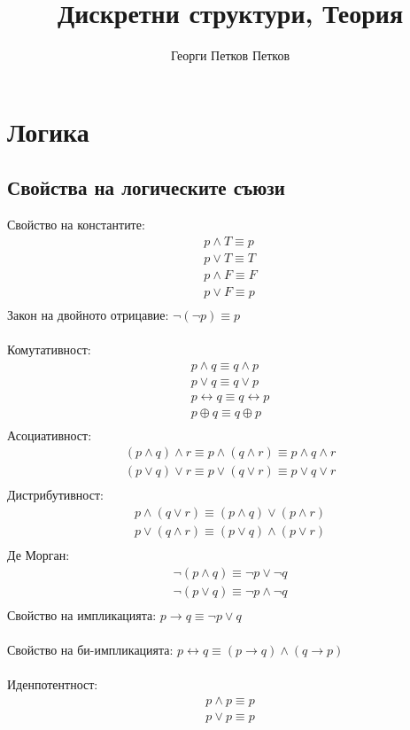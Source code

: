 \documentclass[12pt]{article}
\title{Дискретни структури, Теория}
\author{Георги Петков Петков}
\date{}
\begin{document}
    \maketitle
    \section{Логика}
    \subsection*{Свойства на логическите съюзи}
    Свойство на константите:
    \begin{gather*}
        p \land T \equiv p \\
        p \lor T \equiv T \\
        p \land F \equiv F \\
        p \lor F \equiv p \\
    \end{gather*}
    Закон на двойното отрицавие: \( \neg(\neg p) \equiv p \) \\ \\
    Комутативност: 
    \begin{gather*}
        p \land q \equiv q \land p \\
        p \lor q \equiv q \lor p \\
        p \leftrightarrow q \equiv q \leftrightarrow p \\
        p \oplus q \equiv q \oplus p \\
    \end{gather*}
    Асоциативност:
    \begin{gather*}
        (p \land q) \land r \equiv p \land (q \land r) \equiv p \land q \land r \\
        (p \lor q) \lor r \equiv p \lor (q \lor r) \equiv p \lor q \lor r \\
    \end{gather*}
    Дистрибутивност:
    \begin{gather*}
        p \land (q \lor r) \equiv (p \land q) \lor (p \land r) \\
        p \lor (q \land r) \equiv (p \lor q) \land (p \lor r) \\ 
    \end{gather*}
    Де Морган:
    \begin{gather*}
        \neg (p \land q) \equiv \neg p \lor \neg q \\
        \neg (p \lor q) \equiv \neg p \land \neg q \\
    \end{gather*}
    Свойство на импликацията: \( p \to q \equiv \neg p \lor q \) \\ \\
    Свойство на би-импликацията: \( p \leftrightarrow q \equiv ( p \to q ) \land ( q \to p ) \) \\ \\
    Иденпотентност:
    \begin{gather*}
        p \land p \equiv p \\
        p \lor p \equiv p 
    \end{gather*}
\end{document}

